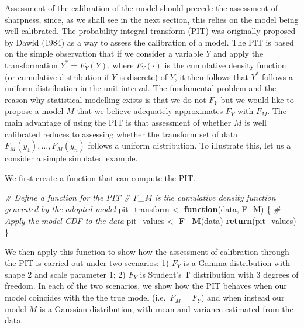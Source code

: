 \documentclass[
  letterpaper,
]{krantz}
\newenvironment{Shaded}{\begin{snugshade}}{\end{snugshade}}
\newcommand{\CommentTok}[1]{\textcolor[rgb]{0.56,0.35,0.01}{\textit{#1}}}
\newcommand{\ControlFlowTok}[1]{\textcolor[rgb]{0.13,0.29,0.53}{\textbf{#1}}}
\newcommand{\FunctionTok}[1]{\textcolor[rgb]{0.13,0.29,0.53}{\textbf{#1}}}
\newcommand{\NormalTok}[1]{#1}
\newcommand{\OtherTok}[1]{\textcolor[rgb]{0.56,0.35,0.01}{#1}}
\begin{document}
Assessment of the calibration of the model should precede the assessment
of sharpness, since, as we shall see in the next section, this relies on
the model being well-calibrated. The probability integral transform
(PIT) was originally proposed by Dawid (1984) as a way to assess the
calibration of a model. The PIT is based on the simple observation that
if we consider a variable \(Y\) and apply the transformation
\(Y^* = F_{Y}(Y)\), where \(F_{Y}(\cdot)\) is the cumulative density
function (or cumulative distribution if \(Y\) is discrete) of \(Y\), it
then follows that \(Y^*\) follows a uniform distribution in the unit
interval. The fundamental problem and the reason why statistical
modelling exists is that we do not \(F_{Y}\) but we would like to
propose a model \(M\) that we believe adequately approximates \(F_{Y}\)
with \(F_{M}\). The main advantage of using the PIT is that assessment
of whether \(M\) is well calibrated reduces to assessing whether the
transform set of data \(F_{M}(y_1), \ldots, F_{M}(y_n)\) follows a
uniform distribution. To illustrate this, let us a consider a simple
simulated example.

We first create a function that can compute the PIT.

\begin{Shaded}
\begin{Highlighting}[]
\CommentTok{\# Define a function for the PIT}
\CommentTok{\# F\_M is the cumulative density function generated by the adopted model}
\NormalTok{pit\_transform }\OtherTok{\textless{}{-}} \ControlFlowTok{function}\NormalTok{(data, F\_M) \{}
  \CommentTok{\# Apply the model CDF to the data}
\NormalTok{  pit\_values }\OtherTok{\textless{}{-}} \FunctionTok{F\_M}\NormalTok{(data)}
  \FunctionTok{return}\NormalTok{(pit\_values)}
\NormalTok{\}}
\end{Highlighting}
\end{Shaded}

We then apply this function to show how the assessment of calibration
through the PIT is carried out under two scenarios: 1) \(F_{Y}\) is a
Gamma distribution with shape 2 and scale parameter 1; 2) \(F_{Y}\) is
Student's T distribution with 3 degrees of freedom. In each of the two
scenarios, we show how the PIT behaves when our model coincides with the
the true model (i.e.~\(F_{M} = F_{Y}\)) and when instead our model \(M\)
is a Gaussian distribution, with mean and variance estimated from the
data.
\end{document}

